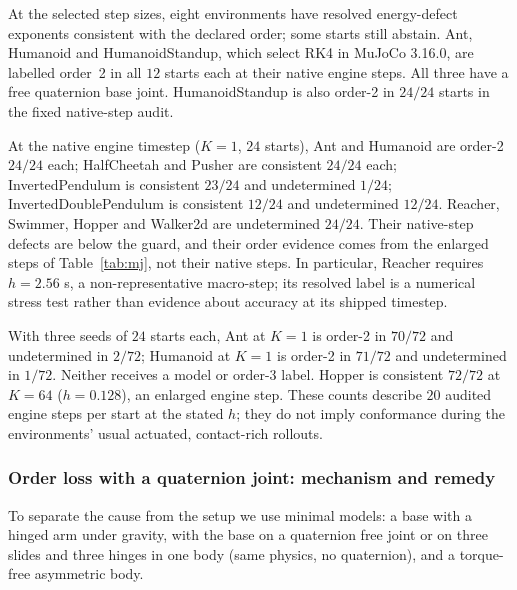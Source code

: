 \documentclass[10pt]{article}
\theoremstyle{definition}
\newcommand{\fittable}[2][\linewidth]{%
  \sbox{\tablebox}{#2}%
  \ifdim\wd\tablebox>#1\relax
    \resizebox{#1}{!}{\usebox{\tablebox}}%
  \else
    \usebox{\tablebox}%
  \fi}
\begin{document}
\begin{table}[htbp]
\centering\small
\fittable{}
\caption{Integrator-order audit, conservative setup, MuJoCo energy as the
invariant.}
\label{tab:mj}
\end{table}

At the selected step sizes, eight environments have resolved energy-defect
exponents consistent with the declared order; some starts still abstain.
Ant, Humanoid and HumanoidStandup, which select RK4 in MuJoCo 3.16.0,
are labelled order~2 in all $12$ starts each at their native engine steps.
All three have a free quaternion base joint. HumanoidStandup is also order-2
in $24/24$ starts in the fixed native-step audit.

At the native engine timestep ($K=1$, $24$ starts), Ant and Humanoid are
order-2 $24/24$ each; HalfCheetah and Pusher are consistent $24/24$ each;
InvertedPendulum is consistent $23/24$ and undetermined $1/24$;
InvertedDoublePendulum is consistent $12/24$ and undetermined $12/24$.
Reacher, Swimmer, Hopper and Walker2d are undetermined $24/24$. Their
native-step defects are below the guard, and their order evidence comes from
the enlarged steps of Table~\ref{tab:mj}, not their native steps.
In particular, Reacher requires $h=2.56$ s, a non-representative macro-step;
its resolved label is a numerical stress test rather than evidence about
accuracy at its shipped timestep.

With three seeds of $24$ starts each, Ant at $K=1$ is order-2 in $70/72$
and undetermined in $2/72$; Humanoid at $K=1$ is order-2 in $71/72$ and
undetermined in $1/72$. Neither receives a model or order-3 label.
Hopper is consistent $72/72$ at $K=64$ ($h=0.128$), an enlarged engine step.
These counts describe $20$ audited engine steps per start at the stated $h$;
they do not imply conformance during the environments' usual actuated,
contact-rich rollouts.

\subsubsection{Order loss with a quaternion joint: mechanism and remedy}\label{sec:audit:quat}

To separate the cause from the setup we use minimal models:
a base with a hinged arm under gravity, with the base on a quaternion free joint
or on three slides and three hinges in one body (same physics, no quaternion),
and a torque-free asymmetric body.

\begin{table}[htbp]
\centering\small
\fittable{}
\caption{Controlled attribution of the order loss (MuJoCo, $h=0.05$).}
\label{tab:mj-quat}
\end{table}
\end{document}
